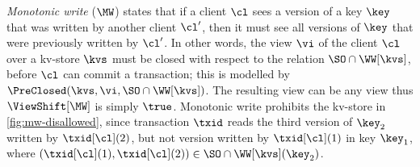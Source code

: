 \emph{Monotonic write} (\(\MW\)) \citep{session-guarantee,repldatatypes} states that if a client \(\cl\) sees 
a version of a key \( \key \) that was written by another client \(\cl'\), 
then it must see all versions of \( \key \) that were 
previously written by \( \cl' \).
In other words, the view \( \vi \) of the client \(\cl\) over a kv-store \(\kvs\) 
must be closed with respect to the relation \(\SO \cap \WW[\kvs]\), 
before \(\cl\) can commit a transaction;
this is modelled by \( \PreClosed(\kvs, \vi, \SO \cap \WW[\kvs]) \).
The resulting view can be any view thus \(\ViewShift[\MW]\) is simply \(\true\).
Monotonic write prohibits the kv-store in \cref{fig:mw-disallowed},
since transaction \( \txid \) reads the third version of \( \key_2 \) written by \( \txid[\cl](2) \),
but not version written by \( \txid[\cl](1) \) in key \( \key_1 \), 
where \( (\txid[\cl](1), \txid[\cl](2)) \in \SO \cap \WW[\kvs](\key_2) \).


